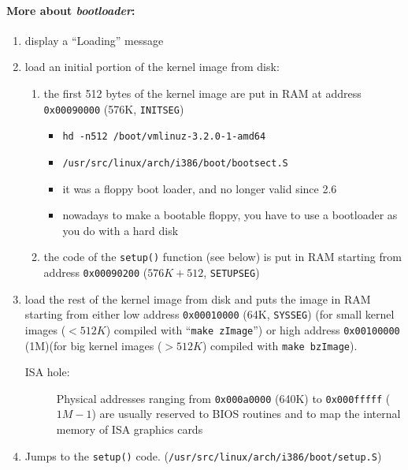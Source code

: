 \paragraph{More about \emph{bootloader}:}
\begin{enumerate}
\item display a ``Loading'' message
\item load an initial portion of the kernel image from disk:
  \begin{enumerate}
  \item the first 512 bytes of the kernel image are put in RAM at address
    \texttt{0x00090000} (576K, \texttt{INITSEG})
    \begin{itemize}
    \item \texttt{hd -n512 /boot/vmlinuz-3.2.0-1-amd64}
    \item \texttt{/usr/src/linux/arch/i386/boot/bootsect.S}
    \item it was a floppy boot loader, and no longer valid since 2.6
    \item nowadays to make a bootable floppy, you have to use a bootloader as you do with
      a hard disk
    \end{itemize}
  \item the code of the \texttt{setup()} function (see below) is put in RAM starting
    from address \texttt{0x00090200} ($576K+512$, \texttt{SETUPSEG})
  \end{enumerate}
\item load the rest of the kernel image from disk and puts the image in RAM starting from
  either low address \texttt{0x00010000} (64K, \texttt{SYSSEG}) (for small kernel images
  ($< 512K$) compiled with ``\texttt{make zImage}'') or high address
  \texttt{0x00100000} (1M)(for big kernel images ($> 512K$) compiled with \texttt{make
    bzImage}).
  \begin{description}
  \item[ISA hole:] Physical addresses ranging from \texttt{0x000a0000} (640K) to
    \texttt{0x000fffff} ($1M-1$) are usually reserved to BIOS routines and to map the
    internal memory of ISA graphics cards
  \end{description}
\item Jumps to the \texttt{setup()} code. (\texttt{/usr/src/linux/arch/i386/boot/setup.S})
\end{enumerate}


